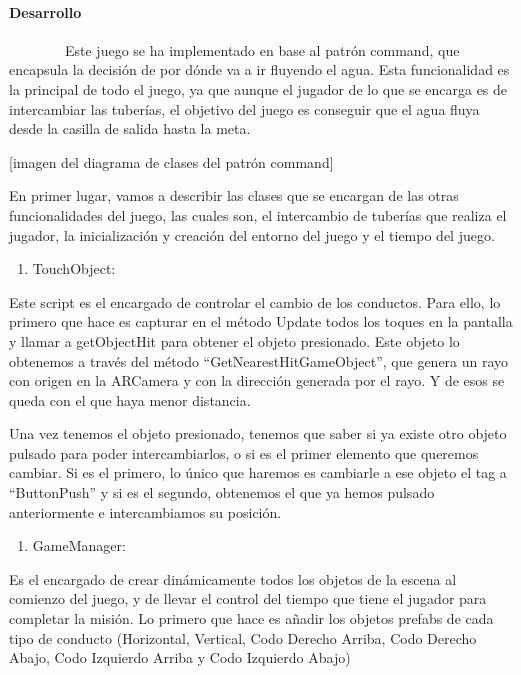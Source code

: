 \paragraph{Desarrollo}\label{h.2u6wntf}

~~~~~~~~Este juego se ha implementado en base al patrón command, que
encapsula la decisión de por dónde va a ir fluyendo el agua. Esta
funcionalidad es la principal de todo el juego, ya que aunque el jugador
de lo que se encarga es de intercambiar las tuberías, el objetivo del
juego es conseguir que el agua fluya desde la casilla de salida hasta la
meta.

{[}imagen del diagrama de clases del patrón command{]}

En primer lugar, vamos a describir las clases que se encargan de las
otras funcionalidades del juego, las cuales son, el intercambio de
tuberías que realiza el jugador, la inicialización y creación del
entorno del juego y el tiempo del juego.

\begin{enumerate}
\def\labelenumi{\arabic{enumi}.}
\itemsep1pt\parskip0pt
\item
  TouchObject:
\end{enumerate}

Este script es el encargado de controlar el cambio de los conductos.
Para ello, lo primero que hace es capturar en el método Update todos los
toques en la pantalla y llamar a getObjectHit para obtener el objeto
presionado. Este objeto lo obtenemos a través del método
``GetNearestHitGameObject'', que genera un rayo con origen en la
ARCamera y con la dirección generada por el rayo. Y de esos se queda con
el que haya menor distancia.

Una vez tenemos el objeto presionado, tenemos que saber si ya existe
otro objeto pulsado para poder intercambiarlos, o si es el primer
elemento que queremos cambiar. Si es el primero, lo único que haremos es
cambiarle a ese objeto el tag a ``ButtonPush'' y si es el segundo,
obtenemos el que ya hemos pulsado anteriormente e intercambiamos su
posición.

\begin{enumerate}
\def\labelenumi{\arabic{enumi}.}
\setcounter{enumi}{1}
\itemsep1pt\parskip0pt
\item
  GameManager:~~~~~~~~
\end{enumerate}

Es el encargado de crear dinámicamente todos los objetos de la escena al
comienzo del juego, y de llevar el control del tiempo que tiene el
jugador para completar la misión. Lo primero que hace es añadir los
objetos prefabs de cada tipo de conducto (Horizontal, Vertical, Codo
Derecho Arriba, Codo Derecho Abajo, Codo Izquierdo Arriba y Codo
Izquierdo Abajo)


